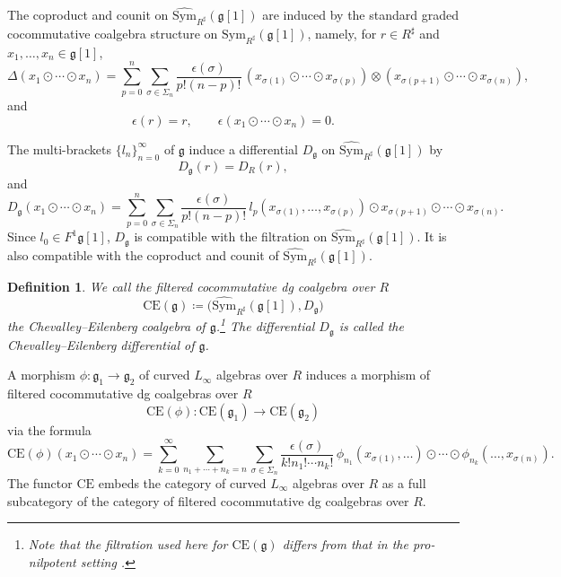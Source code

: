 \documentclass[12pt]{amsart}
\newtheorem{defn}{Definition}[section]
\numberwithin{equation}{section}
\theoremstyle{plain}
\newcommand{\fg}{\mathfrak{g}}
\newcommand{\Sym}{\mathrm{Sym}}
\newcommand{\CE}{\mathrm{CE}}
\newcommand{\wSym}{\widehat{\Sym}}
\newcommand{\uR}{{R^\sharp}}
\begin{document}
	The coproduct and counit on $\wSym_\uR(\fg[1])$ are induced by the standard graded cocommutative coalgebra structure on $\Sym_\uR(\fg[1])$, namely, for $r \in \uR$ and $x_1,\ldots,x_n \in \fg[1]$,
	\[
	\Delta(x_1 \odot \cdots \odot x_n)
	=
	\sum_{p=0}^n
	\sum_{\sigma \in \Sigma_n}
	\frac{\epsilon(\sigma)}{p!(n-p)!}\,
	(x_{\sigma(1)} \odot \cdots \odot x_{\sigma(p)})
	\otimes
	(x_{\sigma(p+1)} \odot \cdots \odot x_{\sigma(n)}),
	\]
	and
	\[
	\epsilon(r)=r,
	\qquad
	\epsilon(x_1 \odot \cdots \odot x_n)=0.
	\]
	
	The multi-brackets $\{l_n\}_{n=0}^\infty$ of $\fg$ induce a differential $D_\fg$ on $\wSym_\uR(\fg[1])$ by
	\[
	D_\fg(r) = D_R(r),
	\]
	and
	\[
	D_\fg(x_1 \odot \cdots \odot x_n) = \sum_{p=0}^n
	\sum_{\sigma \in \Sigma_n}
	\frac{\epsilon(\sigma)}{p!(n-p)!}
	\,
	l_p(x_{\sigma(1)}, \dots, x_{\sigma(p)}) \odot
	x_{\sigma(p+1)} \odot \cdots \odot x_{\sigma(n)}.
	\]
	Since $l_0 \in F^1 \fg[1]$, $D_\fg$ is compatible with the filtration on $\wSym_\uR(\fg[1])$.  It is also compatible with the coproduct and counit of $\wSym_\uR(\fg[1])$. 
	\begin{defn}
		We call the filtered cocommutative dg coalgebra over $R$
		\[
		\CE(\fg) \coloneqq \bigl(\wSym_\uR(\fg[1]), D_\fg\bigr)
		\]
		the \emph{Chevalley--Eilenberg coalgebra} of $\fg$.\footnote{Note that the filtration used here for $\CE(\fg)$ differs from that in the pro-nilpotent setting \cite{getzler2025higherholonomycurvedlinftyalgebras}.} The differential $D_\fg$ is called the \emph{Chevalley--Eilenberg differential} of $\fg$.
	\end{defn}
	
	
	A morphism $\phi\colon \fg_1 \to \fg_2$ of curved $L_\infty$ algebras over $R$ induces a morphism of filtered cocommutative dg coalgebras over $R$
	\[
	\CE(\phi)\colon \CE(\fg_1) \longrightarrow \CE(\fg_2)
	\]
	via the formula
	\[
	\CE(\phi)(x_1 \odot \cdots \odot x_n)
	=
	\sum_{k=0}^{\infty}
	\sum_{n_1 + \cdots + n_k = n}
	\sum_{\sigma \in \Sigma_n}
	\frac{\epsilon(\sigma)}{k!n_1!\cdots n_k!}\,
	\phi_{n_1}(x_{\sigma(1)},\ldots) \odot \cdots \odot
	\phi_{n_k}(\ldots,x_{\sigma(n)}).
	\]
	The functor $\CE$ embeds the category of curved $L_\infty$ algebras over $R$ as a full subcategory of the category of filtered cocommutative dg coalgebras over $R$. 
	
\end{document}
